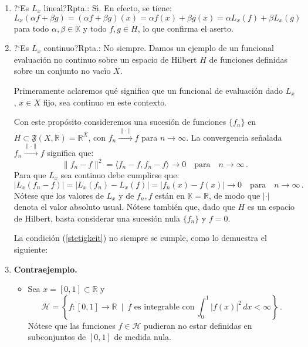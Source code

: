 \begin{enumerate}
\item ?`Es $L_x$ lineal?\quad Rpta.: S\'\i. 
En efecto, se tiene:
\begin{equation*}
L_x(\alpha f + \beta g)
= (\alpha f + \beta g)(x)
= \alpha f(x) + \beta g(x)
= \alpha L_x(f) + \beta L_x(g)
\end{equation*}
para todo $\alpha,\beta\in\mathbb{K}$ y todo $f,g\in H$,
lo que confirma el aserto.

\item ?`Es $L_x$ continuo?\quad Rpta.: No siempre. 
Damos un ejemplo de un funcional evaluaci\'on no continuo sobre un espacio
de Hilbert $H$ de funciones definidas sobre un conjunto no vac\'\i o $X$.

\smallskip\noindent
Primeramente aclaremos qu\'e significa que un funcional de evaluaci\'on
dado $L_x$, $x\in X$ fijo, sea continuo en este contexto.

\smallskip\noindent
Con este prop\'osito consideremos una sucesi\'on de funciones
$\{f_n\}$ en  $H\subset\mathfrak{F}(X,\mathbb{R})=\mathbb{R}^X$,
con $f_n \overset{\|\cdot\|}{\rightarrow}f$ para
$n\rightarrow\infty$.
La convergencia se\~nalada $f_n \overset{\|\cdot\|}{\rightarrow}f$
significa que:
\begin{equation*}
\|f_n-f\|^2 = \langle f_n-f, f_n -f \rangle \rightarrow 0
\quad\text{para}\quad n\rightarrow\infty\,.
\end{equation*}
Para que $L_x$ sea continuo debe cumplirse que:
\begin{equation}\label{stetigkeit}
|L_x(f_n-f)| = |L_x(f_n)-L_x(f)| = |f_n(x) -f(x)| \rightarrow 0 
\quad\text{para}\quad n\rightarrow\infty\,.
\end{equation}
N\'otese que los valores de $L_x$ y de $f_n,f$ est\'an en
$\mathbb{K}=\mathbb{R}$, de modo que $|\cdot|$ denota el valor absoluto
usual.
N\'otese tambi\'en que, dado que $H$ es un espacio de Hilbert,
basta considerar una sucesi\'on nula $\{f_n\}$ y $f=0$.

\smallskip\noindent
La condici\'on (\ref{stetigkeit}) no siempre se cumple, como lo
demuestra el siguiente:

\smallskip\noindent
\item
\textbf{Contraejemplo.}\quad
\begin{itemize}
\item
Sea $x =[0,1]\subset\mathbb{R}$ y 
$$
\mathcal{H} = \left\{ f:[0,1]\rightarrow\mathbb{R} \ \mid\ 
\text{$f$ es integrable con}\ \int_0^1|f(x)|^2\,dx<\infty\right\}\,.
$$
N\'otese que las funciones $f\in\mathcal{H}$ pudieran no estar definidas
en subconjuntos de $[0,1]$ de medida nula.


\end{itemize}
\end{enumerate}
